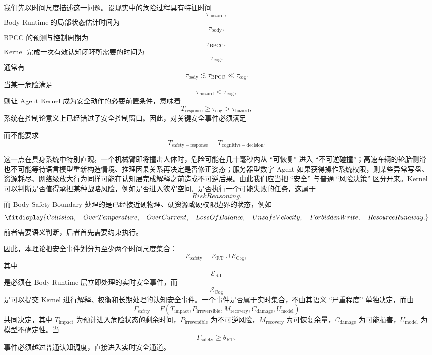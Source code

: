我们先以时间尺度描述这一问题。设现实中的危险过程具有特征时间
\[
\tau_{\mathrm{hazard}},
\]
Body Runtime 的局部状态估计时间为
\[
\tau_{\mathrm{body}},
\]
BPCC 的预测与控制周期为
\[
\tau_{\mathrm{BPCC}},
\]
Kernel 完成一次有效认知闭环所需要的时间为
\[
\tau_{\mathrm{cog}}.
\]
通常有
\[
\tau_{\mathrm{body}}
\lesssim
\tau_{\mathrm{BPCC}}
\ll
\tau_{\mathrm{cog}}.
\]
当某一危险满足
\[
\tau_{\mathrm{hazard}}
<
\tau_{\mathrm{cog}},
\]
则让 Agent Kernel 成为安全动作的必要前置条件，意味着
\[
T_{\mathrm{response}}
\geq
\tau_{\mathrm{cog}}
>
\tau_{\mathrm{hazard}},
\]
系统在控制论意义上已经错过了安全控制窗口。因此，对关键安全事件必须满足
\begin{statementbox}
\centering
{}
\end{statementbox}
而不能要求
\[
T_{\mathrm{safety-response}}
=
T_{\mathrm{cognitive-decision}}.
\]

这一点在具身系统中特别直观。一个机械臂即将撞击人体时，危险可能在几十毫秒内从 ``可恢复'' 进入 ``不可逆碰撞''；高速车辆的轮胎侧滑也不可能等待语言模型重新构造情境、推理因果关系再决定是否修正姿态；服务器型数字 Agent 如果获得操作系统权限，则某些异常写盘、资源耗尽、网络级放大行为同样可能在认知层完成解释之前造成不可逆后果。由此我们应当把 ``安全'' 与普通 ``风险决策'' 区分开来。Kernel 可以判断是否值得承担某种战略风险，例如是否进入狭窄空间、是否执行一个可能失败的任务，这属于
\[
RiskReasoning.
\]
而 Body Safety Boundary 处理的是已经接近硬物理、硬资源或硬权限边界的状态，例如
\[
\fitdisplay{
Collision,\quad
OverTemperature,\quad
OverCurrent,\quad
LossOfBalance,\quad
UnsafeVelocity,\quad
ForbiddenWrite,\quad
ResourceRunaway.
}
\]
前者需要语义判断，后者首先需要约束执行。

因此，本理论把安全事件划分为至少两个时间尺度集合：
\[
\mathcal E_{\mathrm{safety}}
=
\mathcal E_{\mathrm{RT}}
\cup
\mathcal E_{\mathrm{Cog}},
\]
其中
\[
\mathcal E_{\mathrm{RT}}
\]
是必须在 Body Runtime 层立即处理的实时安全事件，而
\[
\mathcal E_{\mathrm{Cog}}
\]
是可以提交 Kernel 进行解释、权衡和长期处理的认知安全事件。一个事件是否属于实时集合，不由其语义 ``严重程度'' 单独决定，而由
\[
\Gamma_{\mathrm{safety}}
=
F(
T_{\mathrm{impact}},
P_{\mathrm{irreversible}},
M_{\mathrm{recovery}},
C_{\mathrm{damage}},
U_{\mathrm{model}}
)
\]
共同决定，其中 $T_{\mathrm{impact}}$ 为预计进入危险状态的剩余时间，$P_{\mathrm{irreversible}}$ 为不可逆风险，$M_{\mathrm{recovery}}$ 为可恢复余量，$C_{\mathrm{damage}}$ 为可能损害，$U_{\mathrm{model}}$ 为模型不确定性。当
\[
\Gamma_{\mathrm{safety}}
\geq
\theta_{\mathrm{RT}},
\]
事件必须越过普通认知调度，直接进入实时安全通道。

